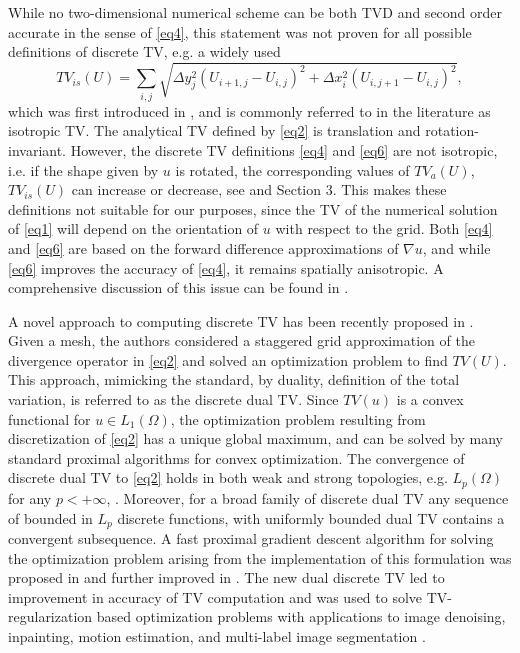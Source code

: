 \documentclass[reqno,a4paper,12pt]{amsart}
\begin{document}
While no two-dimensional numerical scheme can be both TVD and second order accurate in the sense of \eqref{eq4}, this statement was not proven for all possible definitions of discrete TV, e.g. a widely used
\begin{equation}
    TV_{is}(U) = \sum_{i,j} \sqrt{\Delta y_j^2 \left( U_{i+1,j} - U_{i,j} \right)^2 + \Delta x_i^2 \left( U_{i,j+1} - U_{i,j} \right)^2},
    \label{eq6}
\end{equation}
which was first introduced in \cite{rudin1992}, and is commonly referred to in the literature as isotropic TV. The analytical TV defined by \eqref{eq2} is translation and rotation-invariant. However, the discrete TV definitions \eqref{eq4} and \eqref{eq6} are not isotropic, i.e. if the shape given by $u$ is rotated, the corresponding values of $TV_a(U)$, $TV_{is}(U)$ can increase or decrease, see \cite{Condat} and Section 3. This makes these definitions not suitable for our purposes, since the TV of the numerical solution of \eqref{eq1} will depend on the orientation of $u$ with respect to the grid. Both \eqref{eq4} and \eqref{eq6} are based on the forward difference approximations of $\nabla u$, and while \eqref{eq6} improves the accuracy of \eqref{eq4}, it remains spatially anisotropic. A comprehensive discussion of this issue can be found in \cite{Caillaud2020}. 

A novel approach to computing discrete TV has been recently proposed in \cite{Hintermuller}. Given a mesh, the authors considered a staggered grid approximation of the divergence operator in \eqref{eq2} and solved an optimization problem to find $TV(U)$. This approach, mimicking the standard, by duality, definition of the total variation, is referred to as the discrete dual TV. Since $TV(u)$ is a convex functional for $u \in L_1(\Omega)$, the optimization problem resulting from discretization of \eqref{eq2} has a unique global maximum, and can be solved by many standard proximal algorithms for convex optimization. The convergence of discrete dual TV to \eqref{eq2} holds in both weak and strong topologies, e.g. $L_p(\Omega)$ for any $p < +\infty$, \cite{ChambollePock, ChambolleBook}. Moreover, for a broad family of discrete dual TV \cite{ChambollePock} any sequence of bounded in $L_p$ discrete functions, with uniformly bounded dual TV contains a convergent subsequence. A fast proximal gradient descent algorithm for solving the optimization problem arising from the implementation of this formulation was proposed in \cite{Hintermuller} and further improved in \cite{Condat}. The new dual discrete TV led to improvement in accuracy of TV computation and was used to solve TV-regularization based optimization problems with applications to image denoising, inpainting, motion estimation, and multi-label image segmentation \cite{myllykoski2015new,Condat,abboud2019alternating,polisano2019convex,chambolle2020crouzeix}.
\end{document}
